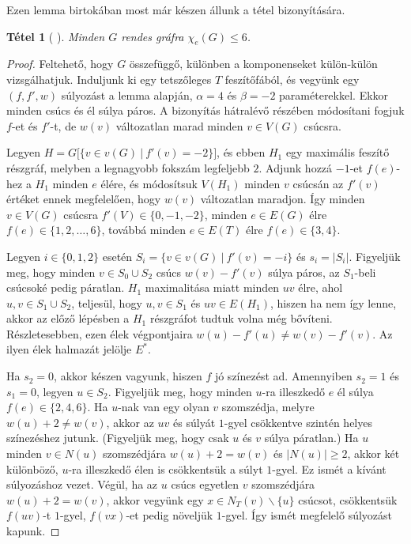 \documentclass[12pt, a4paper]{report}
\newtheorem{tét}{Tétel}[section]
\theoremstyle{remark}
\theoremstyle{definition}
\begin{document}
Ezen lemma birtokában most már készen állunk a tétel bizonyítására.

\begin{tét}[\citeauthor{Kalkowski2009} \cite{Kalkowski2009}]
Minden $G$ rendes gráfra $\chi_e(G) \leq 6$.
\end{tét}

\begin{proof}
Feltehető, hogy $G$ összefüggő, különben a komponenseket külön-külön vizsgálhatjuk. Induljunk ki egy tetszőleges $T$ feszítőfából, és vegyünk egy $(f, f', w)$ súlyozást a lemma alapján, $\alpha = 4$ és $\beta = -2$ paraméterekkel. Ekkor minden csúcs és él súlya páros. A bizonyítás hátralévő részében módosítani fogjuk $f$-et és $f'$-t, de $w(v)$ változatlan marad minden $v \in V(G)$ csúcsra.

Legyen $H = G\lbrack \lbrace v \in v(G)\ |\ f'(v) = -2 \rbrace \rbrack$, és ebben $H_1$ egy maximális feszítő részgráf, melyben a legnagyobb fokszám legfeljebb $2$. Adjunk hozzá $-1$-et $f(e)$-hez a $H_1$ minden $e$ élére, és módosítsuk $V(H_1)$ minden $v$ csúcsán az $f'(v)$ értéket ennek megfelelően, hogy $w(v)$ változatlan maradjon. Így minden $v \in V(G)$ csúcsra $f'(V) \in \lbrace 0, -1, -2 \rbrace$, minden $e \in E(G)$ élre $f(e) \in \lbrace 1, 2, \ldots, 6 \rbrace$, továbbá minden $e \in E(T)$ élre $f(e) \in \lbrace 3, 4 \rbrace$.

Legyen $i \in \lbrace 0, 1, 2 \rbrace$ esetén $S_i = \lbrace v \in v(G)\ |\ f'(v) = -i \rbrace$ és $s_i = |S_i|$. Figyeljük meg, hogy minden $v \in S_0 \cup S_2$ csúcs $w(v) - f'(v)$ súlya páros, az $S_1$-beli csúcsoké pedig páratlan. $H_1$ maximalitása miatt minden $uv$ élre, ahol $u, v \in S_1 \cup S_2$, teljesül, hogy $u, v \in S_1$ és $uv \in E(H_1)$, hiszen ha nem így lenne, akkor az előző lépésben a $H_1$ részgráfot tudtuk volna még bővíteni. Részletesebben, ezen élek végpontjaira $w(u) - f'(u) \neq w(v) - f'(v)$. Az ilyen élek halmazát jelölje $E^*$.

Ha $s_2 = 0$, akkor készen vagyunk, hiszen $f$ jó színezést ad. Amennyiben $s_2 = 1$ és $s_1 = 0$, legyen $u \in S_2$. Figyeljük meg, hogy minden $u$-ra illeszkedő $e$ él súlya $f(e) \in \lbrace 2, 4, 6 \rbrace$. Ha $u$-nak van egy olyan $v$ szomszédja, melyre $w(u) + 2 \neq w(v)$, akkor az $uv$ és súlyát $1$-gyel csökkentve szintén helyes színezéshez jutunk. (Figyeljük meg, hogy csak $u$ és $v$ súlya páratlan.) Ha $u$ minden $v \in N(u)$ szomszédjára $w(u) + 2 = w(v)$ és $|N(u)| \geq 2$, akkor két különböző, $u$-ra illeszkedő élen is csökkentsük a súlyt $1$-gyel. Ez ismét a kívánt súlyozáshoz vezet. Végül, ha az $u$ csúcs egyetlen $v$ szomszédjára $w(u) + 2 = w(v)$, akkor vegyünk egy $x \in N_T(v) \smallsetminus \lbrace u \rbrace$ csúcsot, csökkentsük $f(uv)$-t $1$-gyel, $f(vx)$-et pedig növeljük $1$-gyel. Így ismét megfelelő súlyozást kapunk.


\end{proof}
\end{document}
